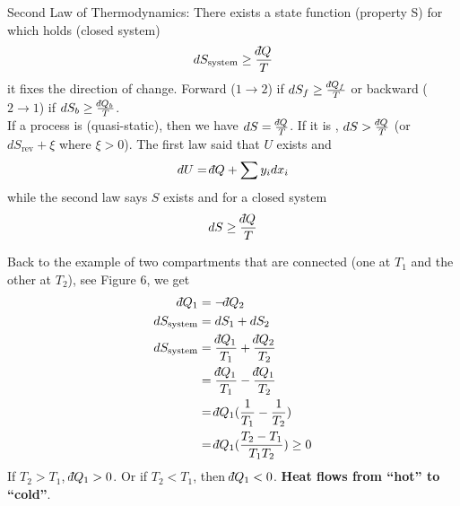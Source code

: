 \documentclass[12pt]{article}
\def\dbar{{\mathchar'26\mkern-12mu d}}
\begin{document}
Second Law of Thermodynamics:  There exists a state function (property S) for which holds (closed system)
\begin{equation}
dS_\text{system} \geq \frac{\dbar Q}{T}
\end{equation}
it fixes the direction of change.  Forward ($1\rightarrow 2$) if $dS_f \geq \frac{\dbar Q_f}{T}$ or backward ($2\rightarrow 1$) if $dS_b \geq \frac{\dbar Q_b}{T}$.\\

If a process is  (quasi-static), then we have $dS = \frac{\dbar Q}{T}$.  If it is , $dS > \frac{\dbar Q}{T}$ (or $dS_\text{rev} + \xi$ where $\xi >0$).  The first law said that $U$ exists and
\begin{equation}
dU = \dbar Q + \sum y_i dx_i
\end{equation}
while the second law says $S$ exists and for a closed system
\begin{equation}
dS \geq \frac{\dbar Q}{T}
\end{equation}

Back to the example of two compartments that are connected (one at $T_1$ and the other at $T_2$), see Figure 6, we get
\begin{align*}
\dbar Q_1 &= -\dbar Q_2\\
dS_\text{system} &= dS_1 + dS_2\\
dS_\text{system} &= \frac{\dbar Q_1}{T_1} + \frac{\dbar Q_2}{T_2}\\
&= \frac{\dbar Q_1}{T_1} - \frac{\dbar Q_1}{T_2}\\
&= \dbar Q_1 (\frac{1}{T_1} - \frac{1}{T_2})\\
&= \dbar Q_1 (\frac{T_2 - T_1}{T_1 T_2}) \geq 0\\
\end{align*}
If $T_2 > T_1$, $\dbar Q_1 > 0$.  Or if $T_2 < T_1$, then $\dbar Q_1 < 0$.  \textbf{Heat flows from ``hot'' to ``cold''}.

\end{document}
